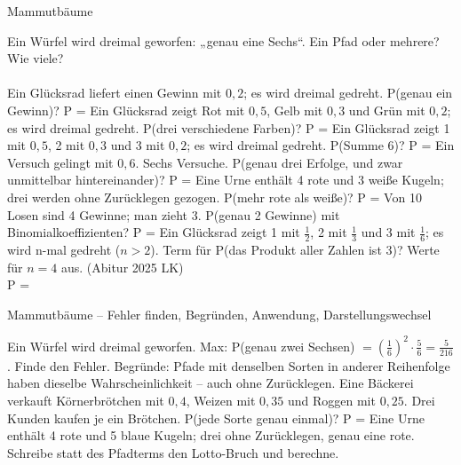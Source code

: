 \setcounter{aufgabe}{22}

\begin{aufgabe}{Mammutbäume}
\begin{teile}
\teil Ein Würfel wird dreimal geworfen: „genau eine Sechs“. Ein Pfad oder mehrere? Wie viele?\\ \\ 
\teil Ein Glücksrad liefert einen Gewinn mit $0{,}2$; es wird dreimal gedreht. P(genau ein Gewinn)? P = \leerfeld
\teil Ein Glücksrad zeigt Rot mit $0{,}5$, Gelb mit $0{,}3$ und Grün mit $0{,}2$; es wird dreimal gedreht. P(drei verschiedene Farben)? P = \leerfeld
\teil Ein Glücksrad zeigt 1 mit $0{,}5$, 2 mit $0{,}3$ und 3 mit $0{,}2$; es wird dreimal gedreht. P(Summe 6)? P = \leerfeld
\teil Ein Versuch gelingt mit $0{,}6$. Sechs Versuche. P(genau drei Erfolge, und zwar unmittelbar hintereinander)? P = \leerfeld
\teil Eine Urne enthält 4 rote und 3 weiße Kugeln; drei werden ohne Zurücklegen gezogen. P(mehr rote als weiße)? P = \leerfeld
\teil Von 10 Losen sind 4 Gewinne; man zieht 3. P(genau 2 Gewinne) mit Binomialkoeffizienten? P = \leerfeld
\teil Ein Glücksrad zeigt 1 mit $\frac{1}{2}$, 2 mit $\frac{1}{3}$ und 3 mit $\frac{1}{6}$; es wird n-mal gedreht ($n > 2$). Term für P(das Produkt aller Zahlen ist 3)? Werte für $n = 4$ aus. \hfill (Abitur 2025 LK) \\ P = \leerfeld
\end{teile}
\end{aufgabe}

\begin{aufgabe}{Mammutbäume – Fehler finden, Begründen, Anwendung, Darstellungswechsel}
\begin{teile}
\teil Ein Würfel wird dreimal geworfen. Max: P(genau zwei Sechsen) $= \left(\frac{1}{6}\right)^2 \cdot \frac{5}{6} = \frac{5}{216}$. Finde den Fehler.
\teil Begründe: Pfade mit denselben Sorten in anderer Reihenfolge haben dieselbe Wahrscheinlichkeit – auch ohne Zurücklegen.
\teil Eine Bäckerei verkauft Körnerbrötchen mit $0{,}4$, Weizen mit $0{,}35$ und Roggen mit $0{,}25$. Drei Kunden kaufen je ein Brötchen. P(jede Sorte genau einmal)? P = \leerfeld
\teil Eine Urne enthält 4 rote und 5 blaue Kugeln; drei ohne Zurücklegen, genau eine rote. Schreibe statt des Pfadterms den Lotto-Bruch und berechne.
\end{teile}
\end{aufgabe}
